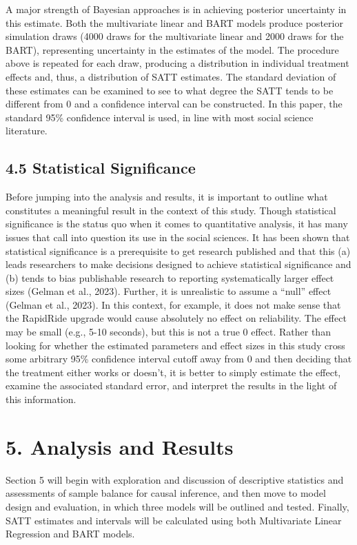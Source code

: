 \documentclass[
  12pt,
]{article}
\begin{document}
A major strength of Bayesian approaches is in achieving posterior
uncertainty in this estimate. Both the multivariate linear and BART
models produce posterior simulation draws (4000 draws for the
multivariate linear and 2000 draws for the BART), representing
uncertainty in the estimates of the model. The procedure above is
repeated for each draw, producing a distribution in individual treatment
effects and, thus, a distribution of SATT estimates. The standard
deviation of these estimates can be examined to see to what degree the
SATT tends to be different from 0 and a confidence interval can be
constructed. In this paper, the standard 95\% confidence interval is
used, in line with most social science literature.

\subsection{4.5 Statistical
Significance}\label{statistical-significance}

Before jumping into the analysis and results, it is important to outline
what constitutes a meaningful result in the context of this study.
Though statistical significance is the status quo when it comes to
quantitative analysis, it has many issues that call into question its
use in the social sciences. It has been shown that statistical
significance is a prerequisite to get research published and that this
(a) leads researchers to make decisions designed to achieve statistical
significance and (b) tends to bias publishable research to reporting
systematically larger effect sizes (Gelman et al., 2023). Further, it is
unrealistic to assume a ``null'' effect (Gelman et al., 2023). In this
context, for example, it does not make sense that the RapidRide upgrade
would cause absolutely no effect on reliability. The effect may be small
(e.g., 5-10 seconds), but this is not a true 0 effect. Rather than
looking for whether the estimated parameters and effect sizes in this
study cross some arbitrary 95\% confidence interval cutoff away from 0
and then deciding that the treatment either works or doesn't, it is
better to simply estimate the effect, examine the associated standard
error, and interpret the results in the light of this information.

\section{5. Analysis and Results}\label{analysis-and-results}

Section 5 will begin with exploration and discussion of descriptive
statistics and assessments of sample balance for causal inference, and
then move to model design and evaluation, in which three models will be
outlined and tested. Finally, SATT estimates and intervals will be
calculated using both Multivariate Linear Regression and BART models.
\end{document}
